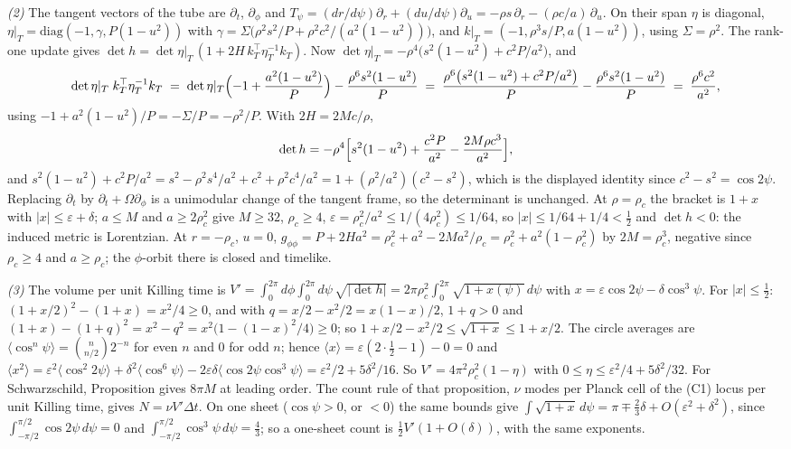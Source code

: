 \emph{(2)} The tangent vectors of the tube are $\partial_t$, $\partial_\phi$ and $T_\psi = (dr/d\psi)\partial_r + (du/d\psi)\partial_u = -\rho s\,\partial_r - (\rho c/a)\,\partial_u$. On their span $\eta$ is diagonal, $\eta|_T = \mathrm{diag}(-1, \gamma, P(1 - u^2))$ with $\gamma = \Sigma\bigl(\rho^2s^2/P + \rho^2c^2/(a^2(1 - u^2))\bigr)$, and $k|_T = (-1, \rho^3 s/P, a(1 - u^2))$, using $\Sigma = \rho^2$. The rank-one update gives $\det h = \det\eta|_T\,(1 + 2H\,k_T^{\top}\eta_T^{-1}k_T)$. Now $\det\eta|_T = -\rho^4\bigl(s^2(1 - u^2) + c^2P/a^2\bigr)$, and
\[
\det\eta|_T\; k_T^{\top}\eta_T^{-1}k_T \;=\; \det\eta|_T\Bigl(-1 + \frac{a^2(1 - u^2)}{P}\Bigr) - \frac{\rho^6 s^2(1 - u^2)}{P}
\;=\; \frac{\rho^6\bigl(s^2(1 - u^2) + c^2P/a^2\bigr)}{P} - \frac{\rho^6 s^2(1 - u^2)}{P} \;=\; \frac{\rho^6c^2}{a^2},
\]
using $-1 + a^2(1 - u^2)/P = -\Sigma/P = -\rho^2/P$. With $2H = 2Mc/\rho$,
\[
\det h = -\rho^4\Bigl[s^2(1 - u^2) + \frac{c^2P}{a^2} - \frac{2M\rho c^3}{a^2}\Bigr],
\]
and $s^2(1 - u^2) + c^2P/a^2 = s^2 - \rho^2s^4/a^2 + c^2 + \rho^2c^4/a^2 = 1 + (\rho^2/a^2)(c^2 - s^2)$, which is the displayed identity since $c^2 - s^2 = \cos 2\psi$. Replacing $\partial_t$ by $\partial_t + \Omega\partial_\phi$ is a unimodular change of the tangent frame, so the determinant is unchanged. At $\rho = \rho_c$ the bracket is $1 + x$ with $|x| \le \varepsilon + \delta$; $a \le M$ and $a \ge 2\rho_c^2$ give $M \ge 32$, $\rho_c \ge 4$, $\varepsilon = \rho_c^2/a^2 \le 1/(4\rho_c^2) \le 1/64$, so $|x| \le 1/64 + 1/4 < \tfrac12$ and $\det h < 0$: the induced metric is Lorentzian. At $r = -\rho_c$, $u = 0$, $g_{\phi\phi} = P + 2H a^2 = \rho_c^2 + a^2 - 2Ma^2/\rho_c = \rho_c^2 + a^2(1 - \rho_c^2)$ by $2M = \rho_c^3$, negative since $\rho_c \ge 4$ and $a \ge \rho_c$; the $\phi$-orbit there is closed and timelike.

\emph{(3)} The volume per unit Killing time is $V' = \int_0^{2\pi}\!d\phi\int_0^{2\pi}\!d\psi\,\sqrt{|\det h|} = 2\pi\rho_c^2\int_0^{2\pi}\sqrt{1 + x(\psi)}\,d\psi$ with $x = \varepsilon\cos 2\psi - \delta\cos^3\psi$. For $|x| \le \tfrac12$: $(1 + x/2)^2 - (1 + x) = x^2/4 \ge 0$, and with $q = x/2 - x^2/2 = x(1 - x)/2$, $1 + q > 0$ and $(1 + x) - (1 + q)^2 = x^2 - q^2 = x^2\bigl(1 - (1 - x)^2/4\bigr) \ge 0$; so $1 + x/2 - x^2/2 \le \sqrt{1 + x} \le 1 + x/2$. The circle averages are $\langle\cos^n\psi\rangle = \binom{n}{n/2}2^{-n}$ for even $n$ and $0$ for odd $n$; hence $\langle x\rangle = \varepsilon(2\cdot\tfrac12 - 1) - 0 = 0$ and $\langle x^2\rangle = \varepsilon^2\langle\cos^2 2\psi\rangle + \delta^2\langle\cos^6\psi\rangle - 2\varepsilon\delta\langle\cos 2\psi\cos^3\psi\rangle = \varepsilon^2/2 + 5\delta^2/16$. So $V' = 4\pi^2\rho_c^2(1 - \eta)$ with $0 \le \eta \le \varepsilon^2/4 + 5\delta^2/32$. For Schwarzschild, Proposition  gives $8\pi M$ at leading order. The count rule of that proposition, $\nu$ modes per Planck cell of the (C1) locus per unit Killing time, gives $N = \nu V'\Delta t$. On one sheet ($\cos\psi > 0$, or $< 0$) the same bounds give $\int\sqrt{1 + x}\,d\psi = \pi \mp \tfrac23\delta + O(\varepsilon^2 + \delta^2)$, since $\int_{-\pi/2}^{\pi/2}\cos 2\psi\,d\psi = 0$ and $\int_{-\pi/2}^{\pi/2}\cos^3\psi\,d\psi = \tfrac43$; so a one-sheet count is $\tfrac12 V'(1 + O(\delta))$, with the same exponents.

